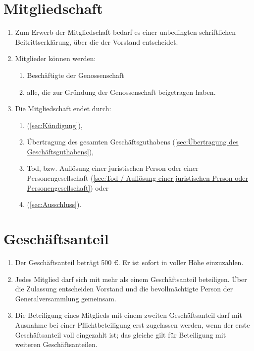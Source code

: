 \documentclass[a4paper, 12pt]{scrartcl}
\begin{document}
\section{Mitgliedschaft}
\begin{enumerate}
  \item Zum Erwerb der Mitgliedschaft bedarf es einer unbedingten schriftlichen Beitrittserklärung, über die der Vorstand entscheidet.
  \item Mitglieder können werden:
    \begin{enumerate}
      \item Beschäftigte der Genossenschaft
      \item alle, die zur Gründung der Genossenschaft beigetragen haben.
    \end{enumerate}
  \item Die Mitgliedschaft endet durch:
  \begin {enumerate}
    \item {} (\autoref{sec:Kündigung}),
    \item Übertragung des gesamten Geschäftsguthabens (\autoref{sec:Übertragung des Geschäftsguthabens}),
    \item Tod, bzw. Auflösung einer juristischen Person oder einer Personengesellschaft (\autoref{sec:Tod / Auflösung einer juristischen Person oder Personengesellschaft}) oder
    \item {} (\autoref{sec:Ausschluss}).
  \end{enumerate}
\end{enumerate}

\section{Geschäftsanteil}
\begin{enumerate}
  \item Der Geschäftsanteil beträgt 500 \euro. Er ist sofort in voller Höhe einzuzahlen.
  \item Jedes Mitglied darf sich mit mehr als einem Geschäftsanteil beteiligen. Über die Zulassung entscheiden Vorstand und die bevollmächtigte Person der Generalversammlung gemeinsam.
  \item Die Beteiligung eines Mitglieds mit einem zweiten Geschäftsanteil darf mit Ausnahme bei einer Pflichtbeteiligung erst zugelassen werden, wenn der erste Geschäftsanteil voll eingezahlt ist; das gleiche gilt für Beteiligung mit weiteren Geschäftsanteilen.
\end{enumerate}
\end{document}
